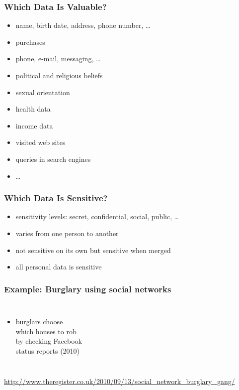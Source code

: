 \documentclass[dvipsnames]{beamer}
\theoremstyle{plain}
\begin{document}
\begin{frame}
  \frametitle{Which Data Is Valuable?}

  \begin{itemize}
    \item name, birth date, address, phone number, \ldots
    \item purchases
    \item phone, e-mail, messaging, \ldots
    \item political and religious beliefs
    \item sexual orientation
    \item health data
    \item income data
    \item visited web sites
    \item queries in search engines
    \item \ldots
  \end{itemize}
\end{frame}

\begin{frame}
  \frametitle{Which Data Is Sensitive?}

  \begin{itemize}
    \item sensitivity levels: secret, confidential, social, public, \ldots
    \item varies from one person to another
    \item not sensitive on its own but sensitive when merged

    \bigskip
    \item all personal data is sensitive
  \end{itemize}
\end{frame}

\begin{frame}
  \frametitle{Example: Burglary using social networks}

  \begin{columns}

    \begin{itemize}
      \item burglars choose\\
        which houses to rob\\
        by checking Facebook\\
        status reports (2010)
    \end{itemize}
  \end{columns}

  \medskip
  \tiny{\url{http://www.theregister.co.uk/2010/09/13/social_network_burglary_gang/}}\\
\end{frame}
\end{document}
